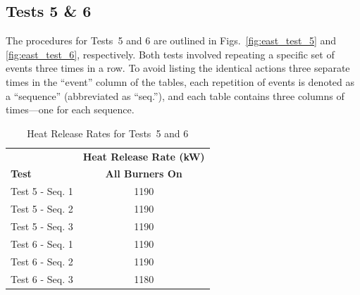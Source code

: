 \documentclass[12pt,oneside]{book}
\begin{document}
\clearpage

\subsection{Tests 5 \& 6}
The procedures for Tests~5 and 6 are outlined in Figs.~\ref{fig:east_test_5} and \ref{fig:east_test_6}, respectively. Both tests involved repeating a specific set of events three times in a row. To avoid listing the identical actions three separate times in the ``event'' column of the tables, each repetition of events is denoted as a ``sequence'' (abbreviated as ``seq.''), and each table contains three columns of times---one for each sequence.

\begin{table}[!ht]
\caption{Heat Release Rates for Tests~5 and 6}
\begin{tabular}{lc}
 \toprule
 & \textbf{Heat Release Rate (kW)} \\
\textbf{Test} & \textbf{All Burners On} \\
\midrule
Test 5 - Seq. 1		& 1190 \\
Test 5 - Seq. 2		& 1190 \\
Test 5 - Seq. 3		& 1190 \\
Test 6 - Seq. 1		& 1190 \\
Test 6 - Seq. 2		& 1190 \\
Test 6 - Seq. 3		& 1180 \\
\bottomrule
\end{tabular}
\label{table:HRR_Tests_5-6}
\end{table}
\end{document}

